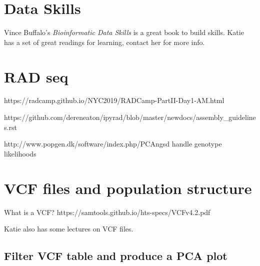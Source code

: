 \documentclass[
  letterpaper,
  DIV=11,
  numbers=noendperiod]{scrreprt}
\begin{document}
\hypertarget{data-skills}{%
\section*{\texorpdfstring{\textbf{Data
Skills}}{Data Skills}}\label{data-skills}}


Vince Buffalo's \emph{Bioinformatic Data Skills} is a great book to
build skills. Katie has a set of great readings for learning, contact
her for more info.

\hypertarget{rad-seq}{%
\section*{\texorpdfstring{\textbf{RAD seq}}{RAD seq}}\label{rad-seq}}


https://radcamp.github.io/NYC2019/RADCamp-PartII-Day1-AM.html

https://github.com/dereneaton/ipyrad/blob/master/newdocs/assembly\_guidelines.rst

http://www.popgen.dk/software/index.php/PCAngsd handle genotype
likelihoods

\hypertarget{vcf-files-and-population-structure}{%
\section*{\texorpdfstring{\textbf{VCF files and population
structure}}{VCF files and population structure}}\label{vcf-files-and-population-structure}}


What is a VCF? https://samtools.github.io/hts-specs/VCFv4.2.pdf

Katie also has some lectures on VCF files.

\hypertarget{filter-vcf-table-and-produce-a-pca-plot}{%
\subsection*{\texorpdfstring{\textbf{Filter VCF table and produce a PCA
plot}}{Filter VCF table and produce a PCA plot}}\label{filter-vcf-table-and-produce-a-pca-plot}}
\end{document}
